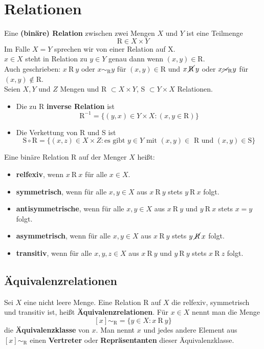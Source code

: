 \documentclass[12pt]{article}
\begin{document}
\section{Relationen}
Eine \textbf{(binäre) Relation} zwischen zwei Mengen $X$ und $Y$ ist eine Teilmenge
\[\text{R} \in X \times Y\]
Im Falle $X = Y$ sprechen wir von einer Relation auf X. \\
$x \in X$ steht in Relation zu $y \in Y$ genau dann wenn $(x, y) \in \text{R}$. \\
Auch geschrieben: $x\:\text{R}\:y$ oder $x \sim_{\text{R}} y$ für $(x, y) \in \text{R}$ und $x\:\cancel{\text{R}}\:y$ oder $x \cancel{\sim}_{\text{R}} y$ für $(x,y) \notin \text{R}$. \\ \newline
Seien $X, Y$ und $Z$ Mengen und R $\subset X \times Y$, S $\subset Y \times X$ Relationen.
\begin{itemize}
    \item Die zu R \textbf{inverse Relation} ist \[\text{R}^{-1} = \{(y,x) \in Y \times X : (x, y \in \text{R})\}\]
    \item Die Verkettung von R und S ist \[\text{S} \circ \text{R} = \{(x,z) \in X \times Z : \text{es gibt } y \in Y \text{ mit } (x,y) \in \text{ R und } (x,y) \in \text{S}\}\]
\end{itemize}
Eine binäre Relation R auf der Menger $X$ heißt:
\begin{itemize}
    \item \textbf{relfexiv}, wenn $x\:\text{R}\:x$ für alle $x \in X$.
    \item \textbf{symmetrisch}, wenn für alle $x, y \in X$ aus $x\:\text{R}\:y$ stets $y\:\text{R}\:x$ folgt.
    \item \textbf{antisymmetrische}, wenn für alle $x, y \in X$ aus $x\:\text{R}\:y$ und $y\:\text{R}\:x$ stets $x = y$ folgt.
    \item \textbf{asymmetrisch}, wenn für alle $x, y \in X$ aus $x\:\text{R}\:y$ stets $y\:\cancel{R}\:x$ folgt.
    \item \textbf{transitiv}, wenn für alle $x, y, z \in X$ aus $x\:\text{R}\:y$ und $y\:\text{R}\:y$ stets $x\:\text{R}\:z$ folgt.
\end{itemize}
\subsection{Äquivalenzrelationen}
Sei $X$ eine nicht leere Menge. Eine Relation R auf $X$ die relfexiv, symmetrisch und transitiv ist, heißt \textbf{Äquivalenzrelationen}. Für $x \in X$ nennt man die Menge
\[[x]\sim_{\text{R}} = \{y \in X : x\:\text{R}\:y\}\]
die \textbf{Äquivalenzklasse} von $x$. Man nennt $x$ und jedes andere Element aus $[x]\sim_{\text{R}}$ einen \textbf{Vertreter} oder \textbf{Repräsentanten} dieser Äquivalenzklasse.
\end{document}

